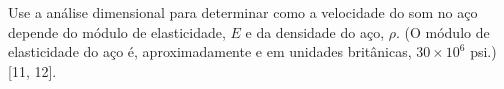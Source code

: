 Use a análise dimensional para determinar como a velocidade do som no aço depende do módulo de elasticidade, $E$ e da densidade do aço, $\rho$. (O módulo de elasticidade do aço é, aproximadamente e em unidades britânicas, $30 \times 10^6$ psi.) [11, 12].
